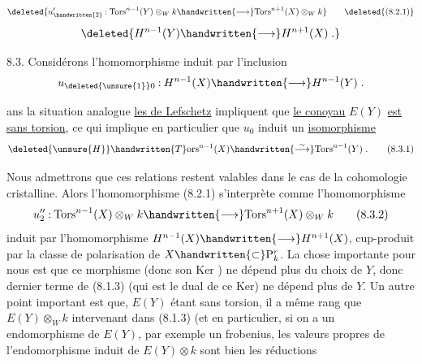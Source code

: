 \[
\deleted{u_{\handwritten{2}}'\mathbin{:}\mathrm{Tors}^{n-1}(Y)\otimes_W k\handwritten{\longrightarrow}\mathrm{Tors}^{n+1}(X)\otimes_W k}
\tag*{\deleted{(8.2.1)}}
\]
\[
\deleted{H^{n-1}(Y)\handwritten{\longrightarrow}H^{n+1}(X)\;.}
\]


8.3. Considérons l'homomorphisme induit par l'inclusion 
\[
u_{\deleted{\unsure{1}}0}\mathbin{:}H^{n-1}(X)\handwritten{\longrightarrow}H^{n-1}(Y)\;.
\]

 ans la situation analogue   \uline{les   de Lefschetz}   impliquent que \uline{le conoyau} $E(Y)$ \uline{est sans torsion}, ce qui implique en particulier que $u_0$ induit un \uline{isomorphisme}
\[
\deleted{\unsure{H}}\handwritten{T}\mathrm{ors}^{n-1}(X)\handwritten{\overset{\sim}{\longrightarrow}}\mathrm{Tors}^{n-1}(Y)\;.
\tag*{(8.3.1)}
\]

Nous admettrons que ces relations restent valables dans le cas de la cohomologie cristalline. Alors l'homomorphisme (8.2.1) s'interprète comme l'homomorphisme
\[
u''_2\mathbin{:}\mathrm{Tors}^{n-1}(X)\otimes_W k\handwritten{\longrightarrow}\mathrm{Tors}^{n+1}(X)\otimes_W k
\tag*{(8.3.2)}
\]
induit par l'homomorphisme $H^{n-1}(X)\handwritten{\longrightarrow}H^{n+1}(X)$, cup-produit par la classe de polarisation de $X\handwritten{\subset}\mathrm P^r_k$. La chose importante pour nous est que ce morphisme (donc son Ker ) ne dépend plus du choix de $Y$, donc    dernier terme de (8.1.3)  (qui est le dual de ce Ker) ne dépend plus de $Y$. Un autre point important est que, $E(Y)$ étant sans torsion, il a même rang que $E(Y)\otimes_W k$ intervenant dans (8.1.3) (et en particulier, si on a un endomorphisme de $E(Y)$, par exemple un frobenius, les valeurs propres de l'endomorphisme induit de $E(Y)\otimes k$ sont bien les réductions
